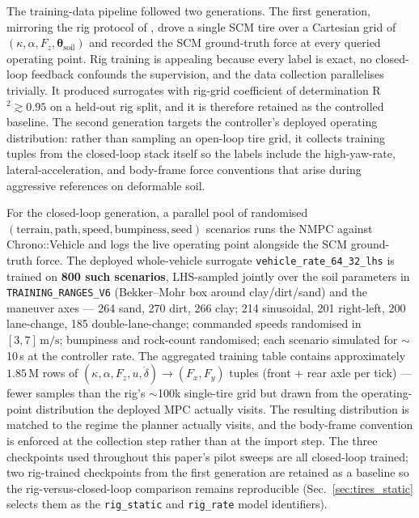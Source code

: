 \documentclass[conference,letterpaper,10pt]{IEEEtran}
\begin{document}
The training-data pipeline followed two generations. The first
generation, mirroring the rig protocol of \cite{Dallas21}, drove a
single SCM tire over a Cartesian grid of $(\kappa, \alpha, F_z,
\boldsymbol{\theta}_{\mathrm{soil}})$ and recorded the SCM
ground-truth force at every queried operating point. Rig training is
appealing because every label is exact, no closed-loop feedback
confounds the supervision, and the data collection parallelises
trivially. It produced surrogates with rig-grid coefficient of
determination R$^2 \gtrsim 0.95$ on a held-out rig split, and it is
therefore retained as the controlled baseline. The second generation
targets the controller's deployed operating distribution: rather than
sampling an open-loop tire grid, it collects training tuples from the
closed-loop stack itself so the labels include the high-yaw-rate,
lateral-acceleration, and body-frame force conventions that arise
during aggressive references on deformable soil.

For the closed-loop generation, a parallel pool
of randomised $(\text{terrain}, \text{path}, \text{speed},
\text{bumpiness}, \text{seed})$ scenarios runs the NMPC against
Chrono::Vehicle and logs the live operating point alongside the SCM
ground-truth force. The deployed whole-vehicle surrogate
\texttt{vehicle\_rate\_64\_32\_lhs} is trained on
\textbf{800 such scenarios}, LHS-sampled jointly over the soil
parameters in \texttt{TRAINING\_RANGES\_V6} (Bekker--Mohr box around
clay/dirt/sand) and the maneuver axes — 264 sand, 270 dirt, 266 clay;
214 sinusoidal, 201 right-left, 200 lane-change, 185
double-lane-change; commanded speeds randomised in
$[3,7]\,\mathrm{m/s}$; bumpiness and rock-count randomised; each
scenario simulated for $\sim$10\,s at the controller rate. The
aggregated training table contains approximately $1.85\,\mathrm{M}$ rows of
$(\kappa,\alpha,F_z,u,\dot\delta)\!\to\!(F_x,F_y)$ tuples (front +
rear axle per tick) — fewer samples than the rig's $\sim$100k
single-tire grid but drawn from the operating-point distribution the
deployed MPC actually visits.
The resulting distribution is matched to the
regime the planner actually visits, and the body-frame convention is
enforced at the collection step rather than at the import step. The
three checkpoints used throughout this
paper's pilot sweeps are all closed-loop trained; two rig-trained
checkpoints from the first generation are retained as a baseline so
the rig-versus-closed-loop comparison remains reproducible
(Sec.~\ref{sec:tires_static} selects them as the \texttt{rig\_static}
and \texttt{rig\_rate} model identifiers).
\end{document}
